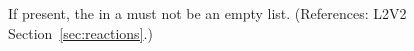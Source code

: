 If present, the  in a \KineticLaw must not
be an empty list.  (References: L2V2
Section~\ref{sec:reactions}.)
